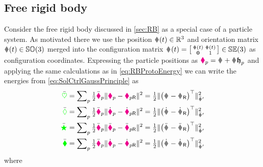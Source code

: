 \subsection{Free rigid body}\label{sec:CtrlApproachParticlesSingleBody}
Consider the free rigid body discussed in \autoref{sec:RB} as a special case of a particle system.
As motivated there we use the position $\r(t)\in \RealNum^3$ and orientation matrix $\R(t)\in\SpecialOrthogonalGroup(3)$ merged into the configuration matrix $\bodyHomoCoord{}{}(t) = \left[\begin{smallmatrix} \R(t) & \r(t) \\ \mat{0} & 1 \end{smallmatrix}\right] \in \SpecialEuclideanGroup(3)$ as configuration coordinates.
Expressing the particle positions as $\particlePos{\PidxI} = \bodyPos{}{} + \bodyRot{}{} \particleBodyPos{\PidxI}$ and applying the same calculations as in \eqref{eq:RBProtoEnergy} we can write the energies from \eqref{eq:SolCtrlGaussPrinciple} as
\begin{subequations}\label{eq:RBCtrlEnergiesParticles}
\begin{align}
 \potentialEnergyC &= \sumParticles \tfrac{1}{2} \particleStiffnessC{\PidxI} \norm{\particlePos{\PidxI} - \particlePosR{\PidxI}}^2
 = \tfrac{1}{2} \norm[\bodyStiffMatCp{}{}]{\big(\bodyHomoCoord{}{} - \bodyHomoCoordR{}{}\big)^\top}^2
\\
 \dissFktC &= \sumParticles \tfrac{1}{2} \particleDampingC{\PidxI} \norm{\particlePosd{\PidxI} - \particlePosRd{\PidxI}}^2
 = \tfrac{1}{2} \norm[\bodyDissMatCp{}{}]{\big(\bodyHomoCoordd{}{} - \bodyHomoCoordRd{}{}\big)^\top}^2
\\
 \accEnergyC &= \sumParticles \tfrac{1}{2} \particleMassC{\PidxI} \norm{\particlePosdd{\PidxI} - \particlePosRdd{\PidxI}}^2
 = \tfrac{1}{2} \norm[\bodyInertiaMatCp{}{}]{\big(\bodyHomoCoorddd{}{} - \bodyHomoCoordRdd{}{}\big)^\top}^2
\\
 \kineticEnergyC &= \sumParticles \tfrac{1}{2} \particleMassC{\PidxI} \norm{\particlePosd{\PidxI} - \particlePosRd{\PidxI}}^2
 = \tfrac{1}{2} \norm[\bodyInertiaMatCp{}{}]{\big(\bodyHomoCoordd{}{} - \bodyHomoCoordRd{}{}\big)^\top}^2
\end{align}
\end{subequations}
where
